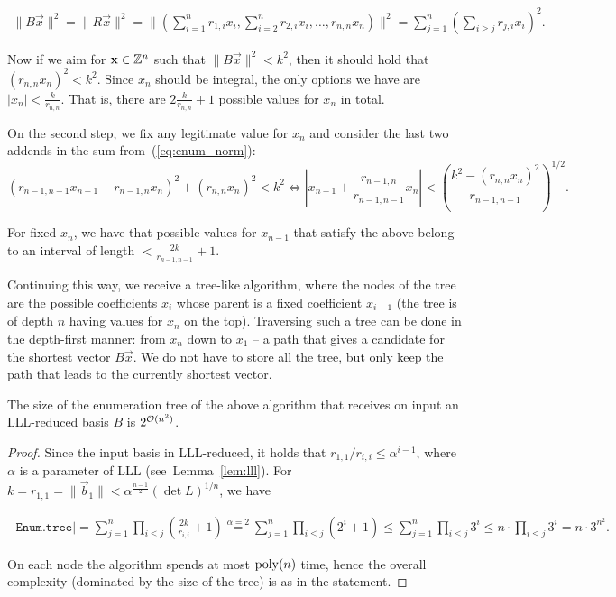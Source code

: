 \begin{align}\label{eq:enum_norm}
	\| B\vec x\|^2  = \| R\vec x\|^2 = \| \left( \sum_{i=1}^n r_{1,i}x_i, \sum_{i=2}^n r_{2,i}x_i, \ldots, r_{n,n} x_n \right) \|^2 = \sum_{j=1}^n \left( \sum_{i \geq j} r_{j,i} x_i \right)^2.
\end{align}

Now if we aim for $\mathbf x \in \mathbb{Z}^n$ such that $\| B \vec x\|^2 < k^2$, then it should hold that $(r_{n,n} x_n)^2 < k^2$. Since $x_n$ should be integral, the only options we have are $|x_n| < \frac{k} {r_{n,n}}$. That is, there are $2 \frac{k}{r_{n,n}}+1$ possible values for $x_n$ in total.

On the second step, we fix any legitimate value for $x_n$ and consider the last two addends in the sum from~(\ref{eq:enum_norm}):
\[
(r_{n-1, n-1}x_{n-1} + r_{n-1, n}x_n)^2 + (r_{n,n}x_n)^2 < k^2 \iff \left|{x_{n-1} + \frac{r_{n-1,n}}{r_{n-1,n-1}}x_n }\right| < \left( \frac{k^2-(r_{n,n}x_n )^2}{r_{n-1, n-1}}\right)^{1/2}.
\]

For fixed $x_{n}$, we have that possible values for $x_{n-1}$ that satisfy the above belong to an interval of length $< \frac{2k}{r_{n-1, n-1}}+1$.

Continuing this way, we receive a tree-like algorithm, where the nodes of the tree are the possible coefficients $x_{i}$ whose parent is a fixed coefficient $x_{i+1}$ (the tree is of depth $n$ having values for $x_n$ on the top). Traversing such a tree can be done in the depth-first manner: from $x_n$ down to $x_1$ -- a path that gives a candidate for the shortest vector $B\vec x$. We do not have to store all the tree, but only keep the path that leads to the currently shortest vector.

\begin{lemma} The size of the enumeration tree of the above algorithm that receives on input an LLL-reduced basis $B$	is $2^{\mathcal{O}(n^2)}$. 
\end{lemma}

\begin{proof}
	Since the input basis in LLL-reduced, it holds that $r_{1,1}/r_{i,i} \leq \alpha^{i-1}$, where $\alpha$ is a parameter of LLL (see~Lemma~\ref{lem:lll}). For $k = r_{1,1} = \| \vec b_1 \| < \alpha^{\frac{n-1}{2}} (\det L)^{1/n}$, we have
	
	\begin{align*}
		|\texttt{Enum.tree}| = \sum_{j=1}^n \prod_{i \leq j} \left( \frac{2k}{r_{i,i}} +1 \right) \stackrel{\alpha=2}{=} \sum_{j=1}^n \prod_{i \leq j} (2^i+1)\leq \sum_{j=1}^n \prod_{i \leq j} 3^i \leq n \cdot  \prod_{i \leq j} 3^i = n \cdot 3^{n^2}.
	\end{align*}

On each node the algorithm spends at most $\operatorname{poly}(n)$ time, hence the overall complexity (dominated by the size of the tree) is as in the statement.
\end{proof}

